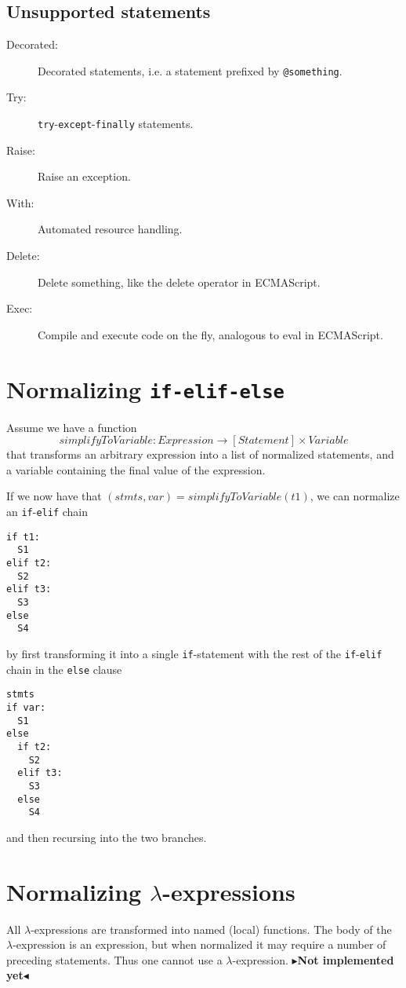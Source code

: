 \documentclass[11pt]{report}
\newcommand{\todo}[1]{{\color[rgb]{.5,0,0}\textbf{$\blacktriangleright$#1$\blacktriangleleft$}}}
\begin{document}
\subsection{Unsupported statements}
\begin{description}
  \item[Decorated:] Decorated statements, i.e. a statement prefixed by
    \verb|@something|.
  \item[Try:] \verb|try|-\verb|except|-\verb|finally| statements.
  \item[Raise:] Raise an exception.
  \item[With:] Automated resource handling.
  \item[Delete:] Delete something, like the delete operator in
    ECMAScript.
  \item[Exec:] Compile and execute code on the fly, analogous to eval
    in ECMAScript.
\end{description}

\section{Normalizing {\tt if-elif-else}}
Assume we have a function $$simplifyToVariable: Expression \rightarrow
[Statement] \times Variable$$ that transforms an arbitrary expression
into a list of normalized statements, and a variable containing the
final value of the expression.

If we now have that $(stmts, var) = simplifyToVariable(t1)$, we can
normalize an \verb!if!-\verb!elif! chain
\begin{verbatim}
if t1:
  S1
elif t2:
  S2
elif t3:
  S3
else
  S4
\end{verbatim}
by first transforming it into a single \verb!if!-statement with the rest of the
\verb!if!-\verb!elif! chain in the \verb!else! clause
\begin{verbatim}
stmts
if var:
  S1
else
  if t2:
    S2
  elif t3:
    S3
  else
    S4
\end{verbatim}
and then recursing into the two branches.

\section{Normalizing $\lambda$-expressions}
All $\lambda$-expressions are transformed into named (local) functions. The body
of the $\lambda$-expression is an expression, but when normalized it may require
a number of preceding statements. Thus one cannot use a $\lambda$-expression.
\todo{Not implemented yet}
\end{document}
